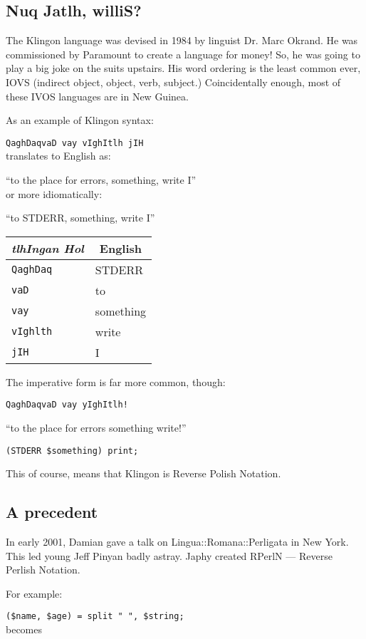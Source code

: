 \documentclass{article}
\begin{document}
\subsection{Nuq Jatlh, williS?}
The Klingon language was devised in 1984 by linguist Dr. Marc Okrand.
He was commissioned by Paramount to create a language for money!  So, he
was going to play a big joke on the suits upstairs.  His word ordering 
is the least common
ever, IOVS (indirect object, object, verb, subject.)  Coincidentally
enough, most of these IVOS languages are in New Guinea.

\noindent As an example of Klingon syntax:

\verb"QaghDaqvaD vay vIghItlh jIH"\\
translates to English as:

``to the place for errors, something, write I''\\
or more idiomatically:

``to STDERR, something, write I''

\begin{center}
\begin{tabular}{l|l}
\multicolumn{1}{c|}{\it tlhIngan Hol} & \multicolumn{1}{c}{English}\\\hline
\verb"QaghDaq" & STDERR\\
\verb"vaD" & to\\
\verb"vay" & something\\
\verb"vIghlth" & write\\
\verb"jIH" & I
\end{tabular}
\end{center}

The imperative form is far more common, though:

\verb"QaghDaqvaD vay yIghItlh!"

``to the place for errors something write!''

\verb"(STDERR $something) print;"

\noindent This of course, means that Klingon is Reverse Polish Notation.

\subsection{A precedent}
In early 2001, Damian gave a talk on Lingua::Romana::Perligata in New 
York.  This led young Jeff Pinyan badly astray.  Japhy created 
RPerlN --- Reverse Perlish Notation.

\noindent For example:

\verb'($name, $age) = split " ", $string;'\\
becomes
\end{document}
